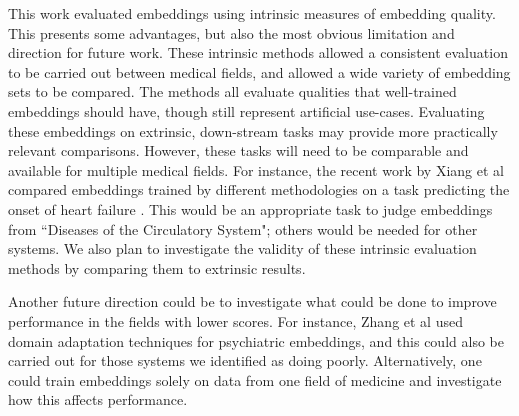 \documentclass[11pt,a4paper]{article}
\begin{document}
This work evaluated embeddings using intrinsic measures of embedding quality. This presents some advantages, but also the most obvious limitation and direction for future work. These intrinsic methods allowed a consistent evaluation to be carried out between medical fields, and allowed a wide variety of embedding sets to be compared. The methods all evaluate qualities that well-trained embeddings should have, though still represent artificial use-cases. Evaluating these embeddings on extrinsic, down-stream tasks may provide more practically relevant comparisons. However, these tasks will need to be comparable and available for multiple medical fields. For instance, the recent work by Xiang et al  compared embeddings trained by different methodologies on a task predicting the onset of heart failure \cite{rasmyStudyGeneralizabilityRecurrent2018}. This would be an appropriate task to judge embeddings from ``Diseases of the Circulatory System";  others would be needed for other systems. We also plan to investigate the validity of these intrinsic evaluation methods by comparing them to extrinsic results. 

Another future direction could be to investigate what could be done to improve performance in the fields with lower scores. For instance, Zhang et al  used domain adaptation techniques for psychiatric embeddings, and this could also be carried out for those systems we identified as doing poorly. Alternatively, one could train embeddings solely on data from one field of medicine and investigate how this affects performance. 




\end{document}
